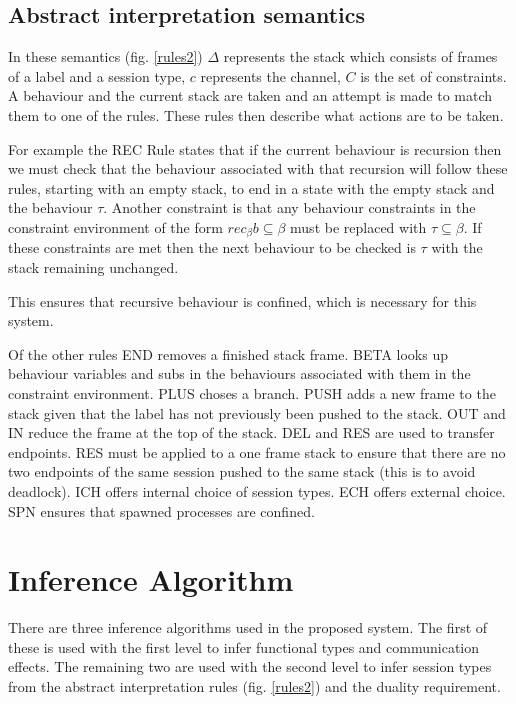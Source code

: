 \subsection{Abstract interpretation semantics}

In these semantics (fig. \ref{rules2}) $\Delta$ represents the stack which consists of frames of a label and a session type, $c$ represents the channel, $C$ is the set of constraints. A behaviour and the current stack are taken and an attempt is made to match them to one of the rules. These rules then describe what actions are to be taken.

For example the REC Rule states that if the current behaviour is recursion then we must check that the behaviour associated with that recursion will follow these rules, starting with an empty stack, to end in a state with the empty stack and the behaviour $\tau$. Another constraint is that any behaviour constraints in the constraint environment of the form $rec_{\beta}b \subseteq \beta$ must be replaced with $\tau \subseteq \beta$. If these constraints are met then the next behaviour to be checked is $\tau$ with the stack remaining unchanged.

This ensures that recursive behaviour is confined, which is necessary for this system. 

Of the other rules END removes a finished stack frame. BETA looks up behaviour variables and subs in the behaviours associated with them in the constraint environment. PLUS choses a branch. PUSH adds a new frame to the stack given that the label has not previously been pushed to the stack. OUT and IN reduce the frame at the top of the stack. DEL and RES are used to transfer endpoints. RES must be applied to a one frame stack to ensure that there are no two endpoints of the same session pushed to the same stack (this is to avoid deadlock). ICH offers internal choice of session types. ECH offers external choice. SPN ensures that spawned processes are confined. 

\section{Inference Algorithm}

There are three inference algorithms used in the proposed system. The first of these is used with the first level to infer functional types and communication effects. The remaining two are used with the second level to infer session types from the abstract interpretation rules (fig. \ref{rules2}) and the duality requirement. 

